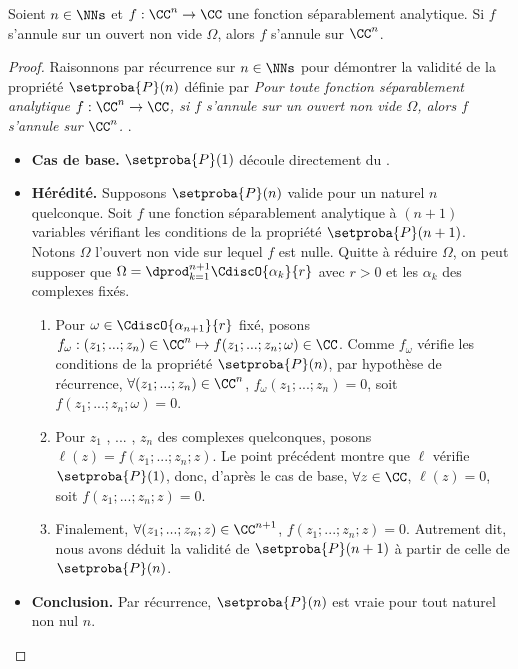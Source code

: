 \begin{fact} \label{sep-isolated-zero}
    Soient $n \in \NNs$
    et
    $f: \CC^n \rightarrow \CC$ une fonction séparablement analytique.
	Si $f$ s'annule sur un ouvert non vide $\Omega$,
	alors $f$ s'annule sur $\CC^n$. 
\end{fact}


\begin{proof}
	Raisonnons par récurrence sur $n \in \NNs$ pour démontrer la validité de la propriété $\setproba{P}(n)$ définie par
	\emph{\og 
		Pour toute fonction séparablement analytique $f: \CC^n \rightarrow \CC$,
		si $f$ s'annule sur un ouvert non vide $\Omega$,
		alors $f$ s'annule sur $\CC^n$. 
	\fg}\kern2pt.
	\begin{itemize}[label=\small\textbullet]
		\item \textbf{Cas de base.}
		$\setproba{P}(1)$ découle directement du .


		\item \textbf{Hérédité.}
		Supposons $\setproba{P}(n)$ valide pour un naturel $n$ quelconque.
		Soit $f$ une fonction séparablement analytique à $(n + 1)$ variables vérifiant les conditions de la propriété $\setproba{P}(n + 1)$.
		Notons $\Omega$ l'ouvert non vide sur lequel $f$ est nulle.
		Quitte à réduire $\Omega$, on peut supposer que
		$\Omega = \dprod_{k=1}^{n+1} \CdiscO{\alpha_k}{r}$
		avec $r > 0$ et les $\alpha_k$ des complexes fixés.
		\begin{enumerate}
		    \item Pour $\omega \in \CdiscO{\alpha_{n+1}}{r}$ fixé,
		    posons
		    $f_\omega: (z_1 ; ... ; z_n) \in \CC^n \mapsto f(z_1 ; ... ; z_n ; \omega) \in \CC$.
		    Comme $f_\omega$ vérifie les conditions de la propriété $\setproba{P}(n)$, par hypothèse de récurrence,
		    $\forall (z_1 ; ... ; z_n) \in  \CC^n$,
		    $f_\omega(z_1 ; ... ; z_n) = 0$, 
		    soit $f(z_1 ; ... ; z_n ; \omega) = 0$.


		    \item Pour $z_1$ , ... , $z_n$ des complexes quelconques,
		    posons $\ell(z) = f(z_1 ; ... ; z_n ; z)$.
		    Le point précédent montre que $\ell$ vérifie $\setproba{P}(1)$,
		    donc, d'après le cas de base,
		    $\forall z \in \CC$,
		    $\ell(z) = 0$,
		    soit $f(z_1 ; ... ; z_n ; z) = 0$.


		    \item Finalement,
		    $\forall (z_1 ; ... ; z_n ; z) \in  \CC^{n+1}$,
		    $f(z_1 ; ... ; z_n ; z) = 0$.
		    Autrement dit, nous avons déduit la validité de $\setproba{P}(n+1)$ à partir de celle de $\setproba{P}(n)$.
		\end{enumerate}
		
		
		\item \textbf{Conclusion.}
		Par récurrence, $\setproba{P}(n)$ est vraie pour tout naturel non nul $n$.
	\end{itemize}

	\null\vspace{-5.75ex}
\end{proof}


